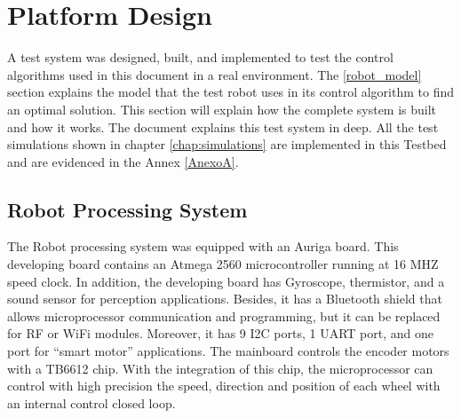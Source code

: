 




\section{Platform Design}

A test system was designed, built, and implemented to test the control algorithms used in this document in a real environment. The \ref{robot_model} section explains the model that the test robot uses in its control algorithm to find an optimal solution. This section will explain how the complete system is built and how it works. The \cite{agrobots} document explains this test system in deep.
All the test simulations shown in chapter \ref{chap:simulations} are implemented in this Testbed and are evidenced in the Annex \ref{AnexoA}.


\subsection{Robot Processing System}
\label{processing}
The Robot processing system was equipped with an Auriga board. This developing board contains an Atmega 2560 microcontroller running at 16 MHZ speed clock. In addition, the developing board has Gyroscope, thermistor, and a sound sensor for perception applications. Besides, it has a Bluetooth shield that allows microprocessor communication and programming, but it can be replaced for RF or WiFi modules. Moreover, it has 9 I2C ports, 1 UART port, and one port for ``smart motor'' applications.
The mainboard controls the encoder motors with a TB6612 chip. With the integration of this chip, the microprocessor can control with high precision the speed, direction and position of each wheel with an internal control closed loop.




